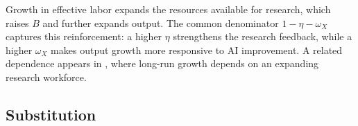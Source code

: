 Growth in effective labor expands the resources available for research, which raises $B$ and further
expands output. The common denominator $1-\eta-\omega_X$ captures
this reinforcement: a higher $\eta$ strengthens the research feedback,
while a higher $\omega_X$ makes output growth more responsive to AI
improvement.
A related dependence appears in \citet{jones1995}, where long-run growth
depends on an expanding research workforce. %

\subsection{Substitution}
\label{subsec:rewrite-uncapped}

